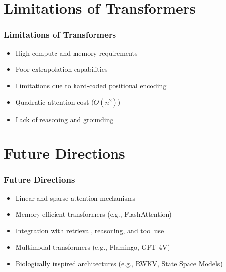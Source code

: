 \section{Limitations of Transformers}
\begin{frame}
    \frametitle{Limitations of Transformers}
    \begin{itemize}
        \item High compute and memory requirements
        \item Poor extrapolation capabilities
        \item Limitations due to hard-coded positional encoding
        \item Quadratic attention cost ($O(n^2)$)
        \item Lack of reasoning and grounding
    \end{itemize}
\end{frame}

\section{Future Directions}
\begin{frame}
    \frametitle{Future Directions}
    \begin{itemize}
        \item Linear and sparse attention mechanisms
        \item Memory-efficient transformers (e.g., FlashAttention)
        \item Integration with retrieval, reasoning, and tool use
        \item Multimodal transformers (e.g., Flamingo, GPT-4V)
        \item Biologically inspired architectures (e.g., RWKV, State Space Models)
    \end{itemize}
\end{frame}